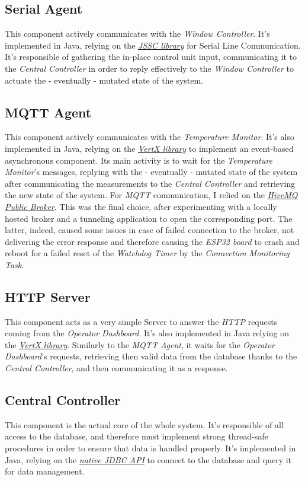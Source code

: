 \documentclass[a4paper,12pt]{report}
\begin{document}
		\subsection{Serial Agent}
		This component actively communicates with the \textit{Window Controller}. It's implemented in Java, relying on the \href{https://github.com/java-native/jssc}{\textit{JSSC library}} for Serial Line Communication. It's responsible of gathering the in-place control unit input, communicating it to the \textit{Central Controller} in order to reply effectively to the \textit{Window Controller} to actuate the - eventually - mutated state of the system.
		\subsection{MQTT Agent}
		This component actively communicates with the \textit{Temperature Monitor}. It's also implemented in Java, relying on the \href{https://vertx.io/}{\textit{VertX library}} to implement an event-based asynchronous component. Its main activity is to wait for the \textit{Temperature Monitor}'s messages, replying with the - eventually - mutated state of the system after communicating the measurements to the \textit{Central Controller} and retrieving the new state of the system.
		For \textit{MQTT} communication, I relied on the \href{https://www.mqtt-dashboard.com/}{\textit{HiveMQ Public Broker}}. This was the final choice, after experimenting with a locally hosted broker and a tunneling application to open the corresponding port. The latter, indeed, caused some issues in case of failed connection to the broker, not delivering the error response and therefore causing the \textit{ESP32 board} to crash and reboot for a failed reset of the \textit{Watchdog Timer} by the \textit{Connection Monitoring Task}.
		\subsection{HTTP Server}
		This component acts as a very simple Server to answer the \textit{HTTP} requests coming from the \textit{Operator Dashboard}. It's also implemented in Java relying on the \href{https://vertx.io/}{\textit{VertX library}}. Similarly to the \textit{MQTT Agent}, it waits for the \textit{Operator Dashboard}'s requests, retrieving then valid data from the database thanks to the \textit{Central Controller}, and then communicating it as a response.
		\subsection{Central Controller}
		This component is the actual core of the whole system. It's responsible of all access to the database, and therefore must implement strong thread-safe procedures in order to ensure that data is handled properly. It's implemented in Java, relying on the \href{https://docs.oracle.com/javase/8/docs/technotes/guides/jdbc/}{\textit{native JDBC API}} to connect to the database and query it for data management.
	
\end{document}
